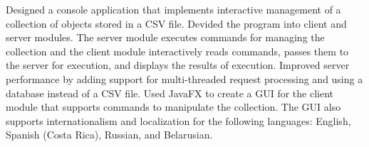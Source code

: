\begin{cvHeadingList}
  \begin{cvList}
    \cvItem Designed a console application that implements interactive
      management of a collection of objects stored in a CSV file.
    \cvItem Devided the program into client and server modules. The
      server module executes commands for managing the collection and
      the client module interactively reads commands, passes them to
      the server for execution, and displays the results of execution.
    \cvItem Improved server performance by adding support for
      multi-threaded request processing and using a database instead
      of a CSV file.
    \cvItem Used JavaFX to create a GUI for the client module that
      supports commands to manipulate the collection. The GUI also
      supports internationalism and localization for the following
      languages: English, Spanish (Costa Rica), Russian, and Belarusian.
  \end{cvList}

\end{cvHeadingList}
